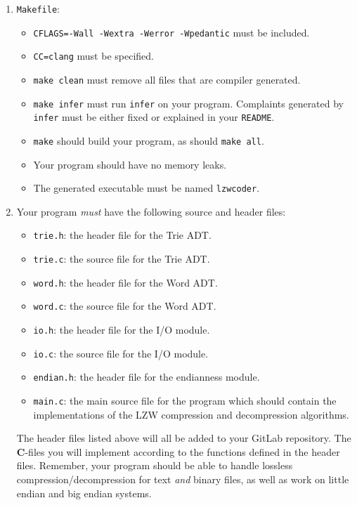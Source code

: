 \documentclass{article}
\begin{document}
\begin{enumerate}
    \item \texttt{Makefile}:
    \begin{itemize}
        \item \texttt{CFLAGS=-Wall -Wextra -Werror -Wpedantic} must be included.
        \item \texttt{CC=clang} must be specified.
        \item \texttt{make clean} must remove all files that are compiler
            generated.
        \item \texttt{make infer} must run \texttt{infer} on your program.
            Complaints generated by \texttt{infer} must be either fixed or
            explained in your \texttt{README}.
        \item \texttt{make} should build your program, as should
            \texttt{make all}.
        \item Your program should have no memory leaks.
        \item The generated executable must be named \texttt{lzwcoder}.
    \end{itemize}
    \item Your program \emph{must} have the following source and header files:
    \begin{itemize}
        \item \texttt{trie.h}: the header file for the Trie ADT.
        \item \texttt{trie.c}: the source file for the Trie ADT.
        \item \texttt{word.h}: the header file for the Word ADT.
        \item \texttt{word.c}: the source file for the Word ADT.
        \item \texttt{io.h}: the header file for the I/O module.
        \item \texttt{io.c}: the source file for the I/O module.
        \item \texttt{endian.h}: the header file for the endianness module.
        \item \texttt{main.c}: the main source file for the program which should
            contain the implementations of the LZW compression and decompression
            algorithms.
    \end{itemize}

    The header files listed above will all be added to your GitLab repository.
    The \textbf{C}-files you will implement according to the functions defined
    in the header files. Remember, your program should be able to handle
    lossless compression/decompression for text \emph{and} binary files,
    as well as work on little endian and big endian systems.


\end{enumerate}
\end{document}
